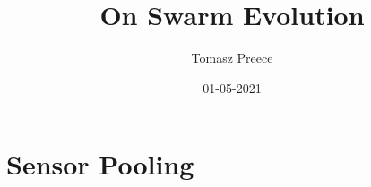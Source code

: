 \documentclass{article}
\title{On Swarm Evolution}
\date{01-05-2021}
\author{Tomasz Preece}
\begin{document}
	\maketitle
	\newpage
	\section{Sensor Pooling}
	
\end{document}
